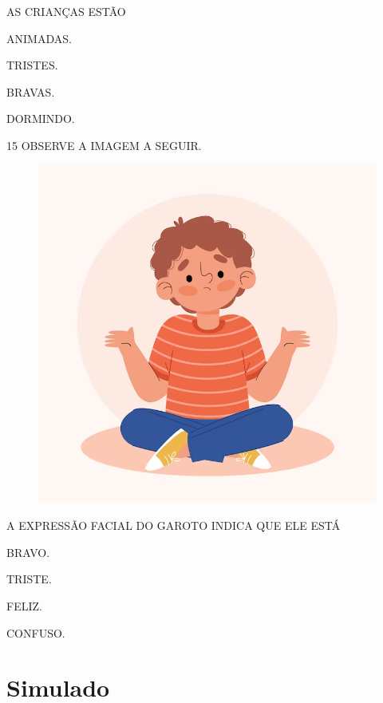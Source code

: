 AS CRIANÇAS ESTÃO

\begin{multicols}{2}
\begin{escolha}

\item ANIMADAS.

\item TRISTES.

\item BRAVAS.

\item DORMINDO.

\end{escolha}
\end{multicols}

\num{15} OBSERVE A IMAGEM A SEGUIR.

\begin{figure}[H]
\centering
\includegraphics[width=.5\textwidth]{./media/image220.png}
\end{figure}

A EXPRESSÃO FACIAL DO GAROTO INDICA QUE ELE ESTÁ

\begin{escolha}

\item BRAVO.

\item TRISTE.

\item FELIZ.

\item CONFUSO.

\end{escolha}

\chapter[Simulado 2]{Simulado}

